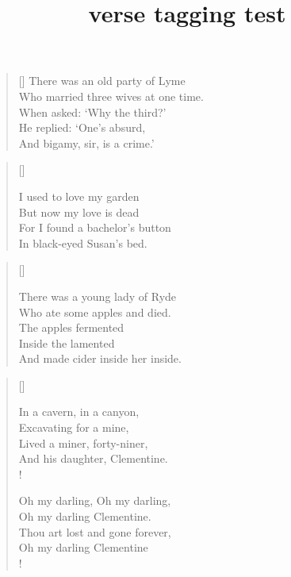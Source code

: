 \documentclass{article}
\title{verse tagging test}
\newcommand{\garden}{
I used to love my garden \\
But now my love is dead \\
For I found a bachelor's button \\
In black-eyed Susan's bed.
}
\begin{document}
\tableofcontents

\renewcommand{\poemtoc}{subsection}
\settowidth{\versewidth}{There was an old party of Lyme}
\begin{verse}[\versewidth]
There was an old party of Lyme \\
Who married three wives at one time. \\
\vin When asked: `Why the third?' \\
\vin He replied: `One's absurd, \\
And bigamy, sir, is a crime.' \\
\end{verse}

\settowidth{\versewidth}{But now my love is dead}
\begin{verse}[\versewidth]
\begin{altverse}
\garden
\end{altverse}
\end{verse}

\settowidth{\versewidth}{There was a young lady of Ryde}
\begin{verse}[\versewidth]
\begin{patverse}
There was a young lady of Ryde \\
Who ate some apples and died. \\
The apples fermented \\
Inside the lamented \\
And made cider inside her inside. \\
\end{patverse}
\end{verse}

\settowidth{\versewidth}{In a cavern, in a canyon,}
\begin{verse}[\versewidth]
\begin{altverse}
 In a cavern, in a canyon, \\
Excavating for a mine, \\
Lived a miner, forty-niner, \label{vs:49} \\
And his daughter, Clementine. \\!
\end{altverse}
\begin{altverse}
 Oh my darling, Oh my darling, \\
Oh my darling Clementine. \\
Thou art lost and gone forever, \\
Oh my darling Clementine \\!
\end{altverse}
\end{verse}
\end{document}

